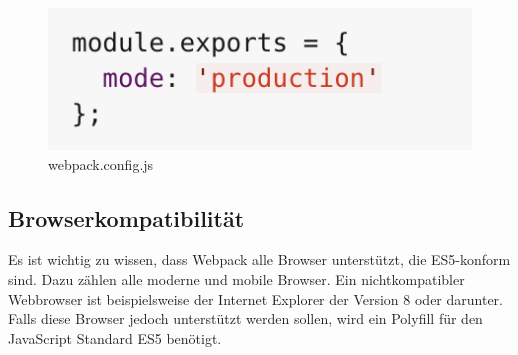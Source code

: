 \begin{figure}[H]
	\begin{center}
		\includegraphics[scale=.7]{images/webpack-mode.png}
	\end{center}
		\caption{webpack.config.js}
\end{figure}

\newpage
\subsection{Browserkompatibilität}
Es ist wichtig zu wissen, dass Webpack alle Browser unterstützt, die ES5-konform sind. Dazu zählen alle moderne und mobile Browser. Ein nichtkompatibler Webbrowser ist beispielsweise der Internet Explorer der Version 8 oder darunter. Falls diese Browser jedoch unterstützt werden sollen, wird ein Polyfill für den JavaScript Standard ES5 benötigt.










